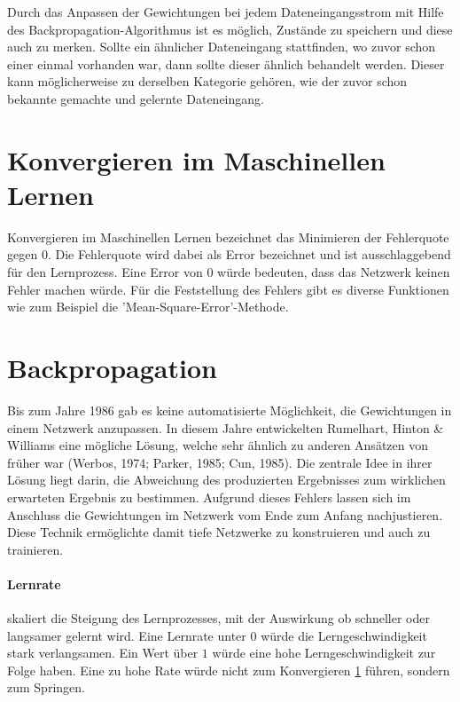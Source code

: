 Durch das Anpassen der Gewichtungen bei jedem Dateneingangsstrom mit Hilfe des Backpropagation-Algorithmus ist es möglich, Zustände zu speichern und diese auch zu merken. 
Sollte ein ähnlicher Dateneingang stattfinden, wo zuvor schon einer einmal vorhanden war, dann sollte dieser ähnlich behandelt werden.
Dieser kann möglicherweise zu derselben Kategorie gehören, wie der zuvor schon bekannte gemachte und gelernte Dateneingang.

\section{Konvergieren im Maschinellen Lernen}
\label{sec:Konvergieren}

Konvergieren im Maschinellen Lernen bezeichnet das Minimieren der Fehlerquote gegen $0$.
Die Fehlerquote wird dabei als Error bezeichnet und ist ausschlaggebend für den Lernprozess.
Eine Error von $0$ würde bedeuten, dass das Netzwerk keinen Fehler machen würde.
Für die Feststellung des Fehlers gibt es diverse Funktionen wie zum Beispiel die 'Mean-Square-Error'-Methode.

\section{Backpropagation}
\label{sec:Backpropagation}

Bis zum Jahre 1986 gab es keine automatisierte Möglichkeit, die Gewichtungen in einem Netzwerk anzupassen.
In diesem Jahre entwickelten Rumelhart, Hinton \& Williams eine mögliche Lösung, welche sehr ähnlich zu anderen Ansätzen von früher war (Werbos, 1974; Parker, 1985; Cun, 1985).
Die zentrale Idee in ihrer Lösung liegt darin, die Abweichung des produzierten Ergebnisses zum wirklichen erwarteten Ergebnis zu bestimmen. 
Aufgrund dieses Fehlers lassen sich im Anschluss die Gewichtungen im Netzwerk vom Ende zum Anfang nachjustieren. 
Diese Technik ermöglichte damit tiefe Netzwerke zu konstruieren und auch zu trainieren.

\paragraph{Lernrate} skaliert die Steigung des Lernprozesses, mit der Auswirkung ob schneller oder langsamer gelernt wird.
Eine Lernrate unter $0$ würde die Lerngeschwindigkeit stark verlangsamen. 
Ein Wert über $1$ würde eine hohe Lerngeschwindigkeit zur Folge haben. 
Eine zu hohe Rate würde nicht zum Konvergieren \ref{sec:Konvergieren} führen, sondern zum Springen.

